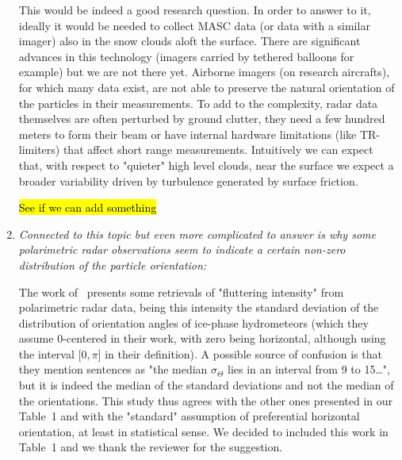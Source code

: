 \documentclass[12pt]{article}
\begin{document}
\begin{enumerate}
    This would be indeed a good research question. In order to answer to it, ideally it would be needed to collect MASC data (or data with a similar imager) also in the snow clouds aloft the surface. There are significant advances in this technology (imagers carried by tethered balloons for example) but we are not there yet. Airborne imagers (on research aircrafts), for which many data exist, are not able to preserve the natural orientation of the particles in their measurements. To add to the complexity, radar data themselves are often perturbed by ground clutter, they need a few hundred meters to form their beam or have internal hardware limitations (like TR-limiters) that affect short range measurements. Intuitively we can expect that, with respect to "quieter" high level clouds, near the surface we expect a broader variability driven by turbulence generated by surface friction.  
    
    \hl{See if we can add something}

    \item \textit{Connected to this topic but even more complicated to answer is why some polarimetric radar observations seem to indicate a certain non-zero distribution of the particle orientation: \cite{Melnikov_JAOT_2013}}

    The work of~\cite{Melnikov_JAOT_2013} presents some retrievals of "fluttering intensity" from polarimetric radar data, being this intensity the standard deviation of the  distribution of orientation angles of ice-phase hydrometeors (which they assume  0-centered in their work, with zero being horizontal, although using the interval [$0,\pi$] in their definition). A possible source of confusion is that they mention sentences as "the median $\sigma_{\Theta}$ lies in an interval from 9 to 15\dots", but it is indeed the median of the standard deviations and not the median of the orientations. This study thus agrees with the other ones presented in our Table~1 and with the "standard" assumption of preferential horizontal orientation, at least in statistical sense. We decided to included this work in Table~1 and we thank the reviewer for the suggestion.    
    
\end{enumerate}



\end{document}
